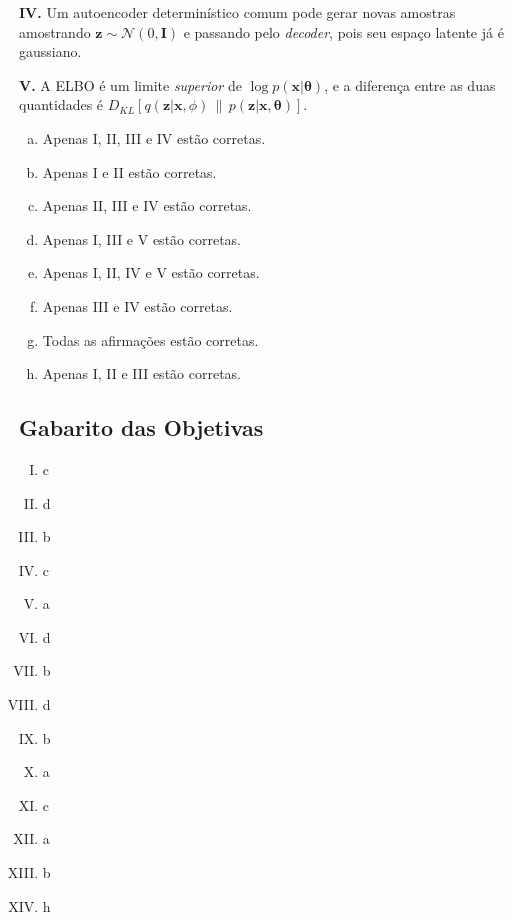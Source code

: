 \documentclass{dlproblemset}
\newcommand{\thetav}{\boldsymbol{\theta}}
\begin{document}
\begin{enumerate}[I)]
    \textbf{IV.} Um autoencoder determinístico comum pode gerar novas amostras amostrando $\mathbf{z} \sim \mathcal{N}(0,\mathbf{I})$ e passando pelo \textit{decoder}, pois seu espaço latente já é gaussiano.

    \textbf{V.} A ELBO é um limite \emph{superior} de $\log p(\mathbf{x}|\thetav)$, e a diferença entre as duas quantidades é $D_{KL}[q(\mathbf{z}|\mathbf{x},\phi)\,\|\,p(\mathbf{z}|\mathbf{x},\thetav)]$.

    \begin{enumerate}[(a)]
        \item Apenas I, II, III e IV estão corretas.
        \item Apenas I e II estão corretas.
        \item Apenas II, III e IV estão corretas.
        \item Apenas I, III e V estão corretas.
        \item Apenas I, II, IV e V estão corretas.
        \item Apenas III e IV estão corretas.
        \item Todas as afirmações estão corretas.
        \item Apenas I, II e III estão corretas.
    \end{enumerate}

\end{enumerate}

\subsection*{Gabarito das Objetivas}
\begin{enumerate}[I)]
\item   c
\item   d
\item   b
\item   c
\item   a
\item   d
\item   b
\item   d
\item   b
\item   a
\item   c
\item   a
\item   b
\item   h
\end{enumerate}
\end{document}

